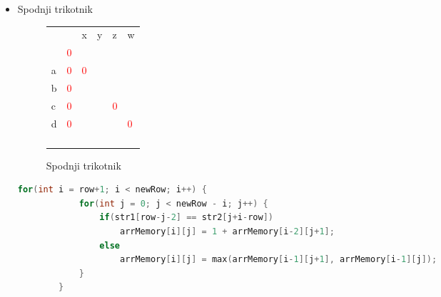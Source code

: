 \documentclass[a4paper,12pt,openright]{book}
\begin{document}
\begin{itemize}
    \item Spodnji trikotnik
    
        \begin{figure}[htb]
        \begin{center}
\begin{tabular}{|l|l|l|l|l|l|}
\cline{3-6}
  \multicolumn{2}{c|}{}  & x & y & z & w\\ \cline{2-6}
 \multicolumn{1}{c|}{} & \textcolor{red}{0} & \multicolumn{4}{c}{} \\ \cline{1-3}
a  & \textcolor{red}{0} & \textcolor{red}{0} &  \multicolumn{3}{c}{} \\ \cline{1-4}
b  & \textcolor{red}{0} &  &  & \multicolumn{2}{c}{}  \\ \cline{1-5}
c  & \textcolor{red}{0} & \textcolor{purple}{} & \textcolor{blue}{} & \textcolor{red}{0} & \multicolumn{1}{c}{} \\ \cline{1-6}
d  & \textcolor{red}{0} & \textcolor{brown}{} & \textcolor{purple}{} & \textcolor{blue}{} & \textcolor{red}{0} \\ \hline
 \multicolumn{1}{c|}{} & \cellcolor{blue!15} & \cellcolor{blue!15} & \cellcolor{blue!15} & \cellcolor{blue!15} & \multicolumn{1}{c}{}  \\ \cline{2-5}
\multicolumn{1}{c|}{}  & \cellcolor{blue!15} & \cellcolor{blue!15} & \cellcolor{blue!15} & \multicolumn{2}{c}{}   \\ \cline{2-4}
\multicolumn{1}{c|}{}  & \cellcolor{blue!15} & \cellcolor{blue!15} &  \multicolumn{3}{c}{}   \\ \cline{2-3}
\multicolumn{1}{c|}{}  & \cellcolor{blue!15} & \multicolumn{4}{c}{}  \\ \cline{2-2}
\end{tabular}
        \end{center}
        \caption{Spodnji trikotnik}
        \label{diagMemory4}
        \end{figure}

        \begin{lstlisting}[language=C++, caption={Izračun spodnjega trikotnika za LCS}, captionpos=b, label=diagonalMemory4]
        for(int i = row+1; i < newRow; i++) {
            for(int j = 0; j < newRow - i; j++) {
                if(str1[row-j-2] == str2[j+i-row])
                    arrMemory[i][j] = 1 + arrMemory[i-2][j+1];
                else
                    arrMemory[i][j] = max(arrMemory[i-1][j+1], arrMemory[i-1][j]);
            }
        }
        \end{lstlisting}
    
\end{itemize}
\end{document}
